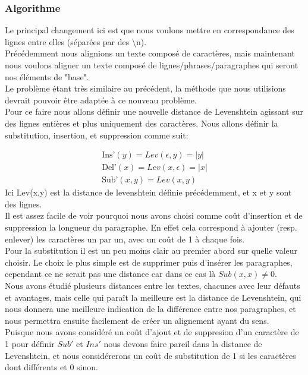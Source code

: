 \documentclass{article}
\begin{document}
\subsubsection{Algorithme}
Le principal changement ici est que nous voulons mettre en correspondance des
lignes entre elles (séparées par des \textbackslash{}n).\\
Précédemment nous alignions un texte composé de caractères, mais maintenant nous
voulons aligner un texte composé de lignes/phrases/paragraphes qui seront nos
éléments de "base".\\

Le problème étant très similaire au précédent, la méthode que nous utilisions
devrait pouvoir être adaptée à ce nouveau problème.\\
Pour ce faire nous allons définir une nouvelle distance de Levenshtein agissant sur
des lignes entières et plus uniquement des caractères.
Nous allons définir la substitution, insertion, et suppression comme suit:

\begin{gather*}
	\text{Ins'}(y) = Lev(\epsilon,y) = \lvert y \rvert\\
	\text{Del'}(x) = Lev(x,\epsilon) = \lvert x \rvert\\
	\text{Sub'}(x,y) = Lev(x,y)
\end{gather*}
Ici Lev(x,y) est la distance de levenshtein définie précédemment, et x et y
sont des lignes.\\

Il est assez facile de voir pourquoi nous avons choisi comme coût d'insertion
et de suppression la longueur du paragraphe. En effet cela correspond à ajouter
(resp. enlever) les caractères un par un, avec un coût de 1 à chaque fois.\\

Pour la substitution il est un peu moins clair au premier abord sur quelle
valeur choisir. Le choix le plus simple est de supprimer puis d'insérer les
paragraphes, cependant ce ne serait pas une distance car dans ce cas là
$Sub(x,x) \neq 0$.\\
Nous avons étudié plusieurs distances entre les textes, chacunes avec leur
défauts et avantages, mais celle qui paraît la meilleure est la distance de
Levenshtein, qui nous donnera une meilleure indication de la différence entre
nos paragraphes, et nous permettra ensuite facilement de créer un alignement
ayant du sens.\\
Puisque nous avons considéré un coût d'ajout et de suppresion d'un caractère de
1 pour définir $Sub'$ et $Ins'$ nous devons faire pareil dans la distance de
Levenshtein, et nous considérerons un coût de substitution de 1 si les
caractères dont différents et 0 sinon.\\
\end{document}
